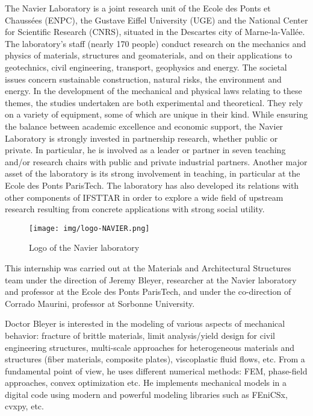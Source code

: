 \documentclass[12pt]{article}
\begin{document}
The Navier Laboratory is a joint research unit of the Ecole des Ponts et Chaussées (ENPC), the Gustave Eiffel University (UGE) and the National Center for Scientific Research (CNRS), situated in the Descartes city of Marne-la-Vallée. The laboratory's staff (nearly 170 people) conduct research on the mechanics and physics of materials, structures and geomaterials, and on their applications to geotechnics, civil engineering, transport, geophysics and energy. The societal issues concern sustainable construction, natural risks, the environment and energy. In the development of the mechanical and physical laws relating to these themes, the studies undertaken are both experimental and theoretical. They rely on a variety of equipment, some of which are unique in their kind. While ensuring the balance between academic excellence and economic support, the Navier Laboratory is strongly invested in partnership research, whether public or private. In particular, he is involved as a leader or partner in seven teaching and/or research chairs with public and private industrial partners. Another major asset of the laboratory is its strong involvement in teaching, in particular at the Ecole des Ponts ParisTech. The laboratory has also developed its relations with other components of IFSTTAR in order to explore a wide field of upstream research resulting from concrete applications with strong social utility.

\begin{figure}[H]
    \centering
    \texttt{[image: img/logo-NAVIER.png]}
    \caption{Logo of the Navier laboratory}
\end{figure}

This internship was carried out at the Materials and Architectural Structures team under the direction of Jeremy Bleyer, researcher at the Navier laboratory and professor at the Ecole des Ponts ParisTech, and under the co-direction of Corrado Maurini, professor at Sorbonne University.
 
Doctor Bleyer is interested in the modeling of various aspects of mechanical behavior: fracture of brittle materials, limit analysis/yield design for civil engineering structures, multi-scale approaches for heterogeneous materials and structures (fiber materials, composite plates), viscoplastic fluid flows, etc. From a fundamental point of view, he uses different numerical methods: FEM, phase-field approaches, convex optimization etc. He implements mechanical models in a digital code using modern and powerful modeling libraries such as FEniCSx, cvxpy, etc. 
 
\end{document}
